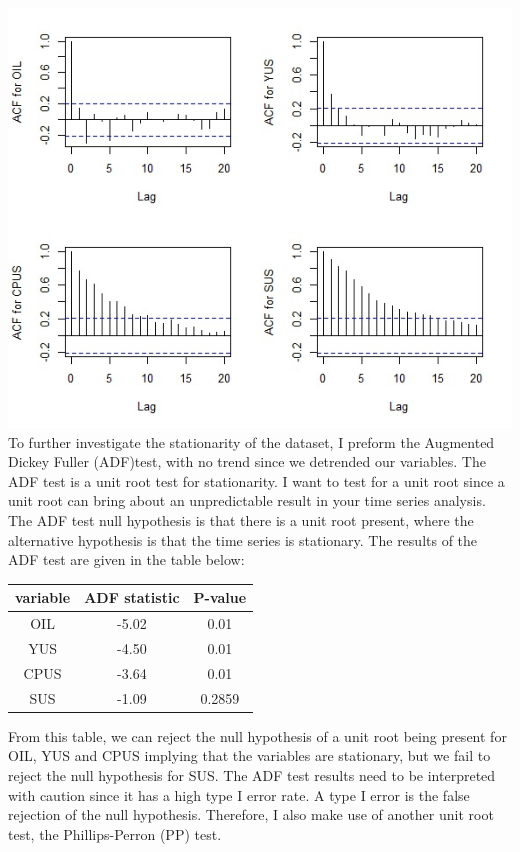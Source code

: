 \documentclass[11pt,preprint, authoryear]{elsarticle}
\numberwithin{equation}{section}
\numberwithin{figure}{section}
\numberwithin{table}{section}
\begin{document}
\includegraphics{ACF.jpg} To further investigate the stationarity of the
dataset, I preform the Augmented Dickey Fuller (ADF)test, with no trend
since we detrended our variables. The ADF test is a unit root test for
stationarity. I want to test for a unit root since a unit root can bring
about an unpredictable result in your time series analysis. The ADF test
null hypothesis is that there is a unit root present, where the
alternative hypothesis is that the time series is stationary. The
results of the ADF test are given in the table below:

\begin{center}
\begin{tabular}{ |c|c|c| } 
 \hline
 variable & ADF statistic & P-value \\ 
 \hline
 OIL & -5.02 & 0.01\\ 
 YUS & -4.50 & 0.01 \\
 CPUS & -3.64 & 0.01 \\
 SUS & -1.09 & 0.2859 \\
 \hline
\end{tabular}
\end{center}

From this table, we can reject the null hypothesis of a unit root being
present for OIL, YUS and CPUS implying that the variables are
stationary, but we fail to reject the null hypothesis for SUS. The ADF
test results need to be interpreted with caution since it has a high
type I error rate. A type I error is the false rejection of the null
hypothesis. Therefore, I also make use of another unit root test, the
Phillips-Perron (PP) test.
\end{document}
